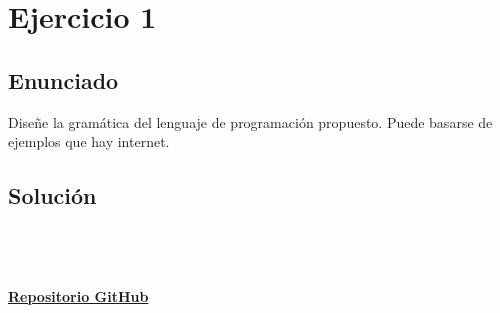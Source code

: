 \documentclass[https://www.overleaf.com/project/63761df255a8a9f4a15c3579
	letterpaper, %
	10pt, %
]{CSUniSchoolLabReport}
\begin{document}

\section*{Ejercicio 1 }

\subsection*{Enunciado}
Diseñe la gramática del lenguaje de programación propuesto. Puede basarse de ejemplos que hay internet.

\subsection*{Solución}



\\
\\
\\
\href{https://github.com/DAOBLUR/CompilersPractices/tree/main/8}{\huge\faGithub \textbf{{Repositorio GitHub}} }
\end{document}
